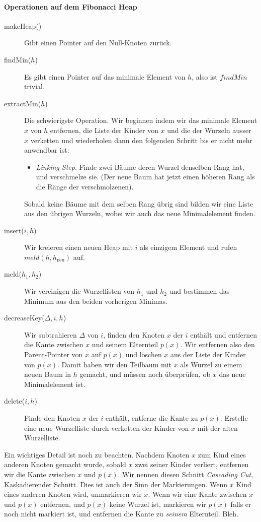 \documentclass[a4paper, 9pt, DIV=20]{scrartcl}
\begin{document}
\paragraph{Operationen auf dem Fibonacci Heap} 
\begin{description}
\item[makeHeap()] Gibt einen Pointer auf den Null-Knoten zurück.
\item[findMin($h$)] Es gibt einen Pointer auf das minimale Element von $h$, also ist $findMin$ trivial.
\item[extractMin($h$)] Die schwierigste Operation. Wir beginnen indem wir das minimale Element $x$ von $h$ entfernen, die Liste der Kinder von $x$ und die der Wurzeln ausser $x$ verketten und wiederholen dann den folgenden Schritt bis er nicht mehr anwendbar ist:
\begin{itemize}[leftmargin=*]
\item
\emph{Linking Step}. Finde zwei Bäume deren Wurzel denselben Rang hat, und verschmelze sie. (Der neue Baum hat jetzt einen höheren Rang als die Ränge der verschmolzenen).
\end{itemize}
Sobald keine Bäume mit dem selben Rang übrig sind bilden wir eine Liste aus den übrigen Wurzeln, wobei wir auch das neue Minimalelement finden.
\item[insert($i,h$)] Wir kreieren einen neuen Heap mit $i$ als einzigem Element und rufen $meld(h, h_{\text{neu}})$ auf.
\item[meld($h_{1}, h_{2}$)] Wir vereinigen die Wurzellisten von $h_{1}$ und $h_{2}$ und bestimmen das Minimum aus den beiden vorherigen Minimas.
\item[decreaseKey($\Delta,i,h$)] Wir subtrahieren $\Delta$ von $i$, finden den Knoten $x$ der $i$ enthält und entfernen die Kante zwischen $x$ und seinem Elternteil $p(x)$. Wir entfernen also den Parent-Pointer von $x$ auf $p(x)$ und löschen $x$ aus der Liste der Kinder von $p(x)$. Damit haben wir den Teilbaum mit $x$ als Wurzel zu einem neuen Baum in $h$ gemacht, und müssen noch überprüfen, ob $x$ das neue Minimalelement ist.
\item[delete($i,h$)] Finde den Knoten $x$ der $i$ enthält, entferne die Kante zu $p(x)$. Erstelle eine neue Wurzelliste durch verketten der Kinder von $x$ mit der alten Wurzelliste.
\end{description}
Ein wichtiges Detail ist noch zu beachten. Nachdem Knoten $x$ zum Kind eines anderen Knoten gemacht wurde, sobald $x$ zwei seiner Kinder verliert, entfernen wir die Kante zwischen $x$ und $p(x)$. Wir nennen diesen Schnitt \emph{Cascading Cut}, Kaskadierender Schnitt. Dies ist auch der Sinn der Markierungen. Wenn $x$ Kind eines anderen Knoten wird, unmarkieren wir $x$. Wenn wir eine Kante zwischen $x$ und $p(x)$ entfernen, und $p(x)$ keine Wurzel ist, markieren wir $p(x)$ falls er noch nicht markiert ist, und entfernen die Kante zu \emph{seinem} Elternteil.
Bleh.
\end{document}
